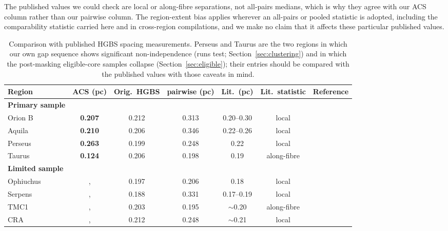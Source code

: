 \documentclass[usenatbib,twoside,twocolumn]{mnras}
\begin{document}
The published values we could check are local or along-fibre separations, not all-pairs medians, which is why they agree with our ACS column rather than our pairwise column. The region-extent bias applies wherever an all-pairs or pooled statistic is adopted, including the comparability statistic carried here and in cross-region compilations, and we make no claim that it affects these particular published values.

\begin{table}
\caption{Comparison with published HGBS spacing measurements. Perseus and Taurus are the two regions in which our own gap sequence shows significant non-independence (runs test; Section~\ref{sec:clustering}) and in which the post-masking eligible-core samples collapse (Section~\ref{sec:eligible}); their entries should be compared with the published values with those caveats in mind.}
\label{tab:literature}
\setlength{\tabcolsep}{4pt}
\footnotesize
\setlength{\tabcolsep}{2.5pt}
\begin{tabular}{lcccccc}
\toprule
Region & ACS (pc) & Orig.\ HGBS & pairwise (pc) & Lit.\ (pc) & Lit.\ statistic & Reference \\
\midrule
\textbf{Primary sample} &  &  &  &  &  &  \\
Orion B & \textbf{0.207} & 0.212 & 0.313 & 0.20--0.30 & local & \citet{Konyves2020} \\
Aquila  & \textbf{0.210} & 0.206 & 0.346 & 0.22--0.26 & local & \citet{Konyves2015} \\
Perseus & \textbf{0.263} & 0.199 & 0.248 & 0.22 & local & \citet{Pezzuto2021} \\
Taurus  & \textbf{0.124} & 0.206 & 0.198 & 0.19 & along-fibre & \citet{Hacar2013} \\
\midrule
\textbf{Limited sample} &  &  &  &  &  &  \\
Ophiuchus &, & 0.197 & 0.206 & 0.18 & local & \citet{Konyves2020} \\
Serpens  &, & 0.188 & 0.331 & 0.17--0.19 & local & \citet{Konyves2020} \\
TMC1     &, & 0.203 & 0.195 & $\sim$0.20 & along-fibre & \citet{Hacar2013} \\
CRA      &, & 0.212 & 0.248 & $\sim$0.21 & local & \citet{Konyves2020} \\
\bottomrule
\end{tabular}


\end{table}
\end{document}
